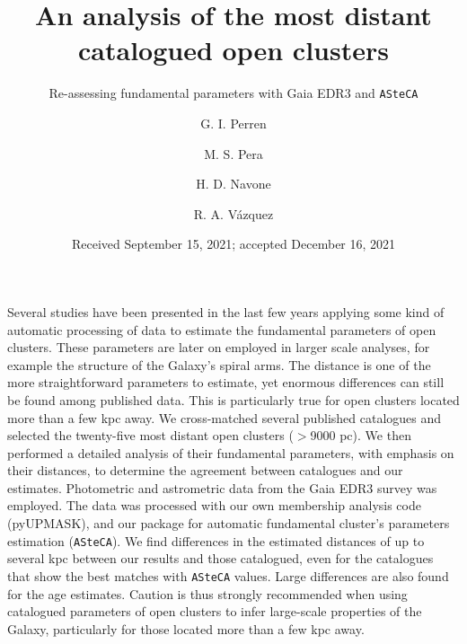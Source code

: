 \documentclass[referee]{aa}
\begin{document}
 


\title{An analysis of the most distant catalogued open clusters}
\subtitle{Re-assessing fundamental parameters with Gaia EDR3 and \texttt{ASteCA}}

\author{G. I. Perren
      \and
      M. S. Pera
      \and
      H. D. Navone
      \and
      R. A. Vázquez
}

\date{Received September 15, 2021; accepted December 16, 2021}

 
\abstract
{Several studies have been presented in the last few years applying some kind of
automatic processing of data to estimate the fundamental parameters of open
clusters. These parameters are later on employed in larger scale analyses, for
example the structure of the Galaxy's spiral arms.
The distance is one of the more straightforward parameters to estimate, yet
enormous differences can still be found among published data. This is
particularly true for open clusters located more than a few kpc away.}
{
We cross-matched several published catalogues and selected the twenty-five most
distant open clusters ($>$9000 pc). We then performed a detailed analysis of
their fundamental parameters, with emphasis on their distances, to determine the
agreement between catalogues and our estimates.}
{Photometric and astrometric data from the Gaia EDR3 survey was employed. The
data was processed with our own membership analysis code (pyUPMASK), and our
package for automatic fundamental cluster's parameters estimation
(\texttt{ASteCA}).}
{We find differences in the estimated distances of up to several kpc
between our results and those catalogued, even for the catalogues that show the
best matches with \texttt{ASteCA} values. Large differences are also found for
the age estimates.}
{Caution is thus strongly recommended when using catalogued parameters of open
clusters to infer large-scale properties of the Galaxy, particularly for those
located more than a few kpc away.}
\end{document}
